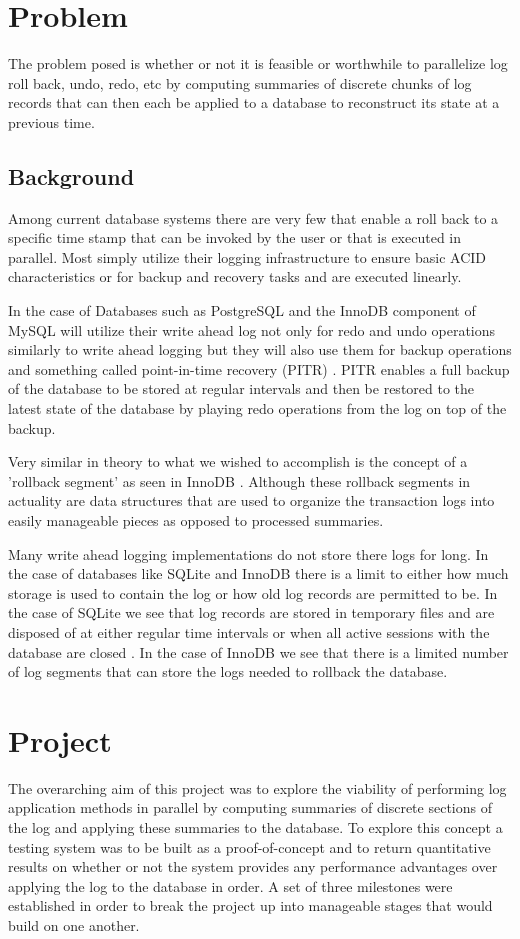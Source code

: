 \documentclass{article}
\begin{document}
\section{Problem}
The problem posed is whether or not it is feasible or worthwhile to parallelize log roll back, undo, redo, etc by computing summaries of discrete chunks of log records that can then each be applied to a database to reconstruct its state at a previous time.

\subsection{Background} 
Among current database systems there are very few that enable a roll back to a specific time stamp that can be invoked by the user or that is executed in parallel. Most simply utilize their logging infrastructure to ensure basic ACID characteristics or for backup and recovery tasks and are executed linearly.

In the case of Databases such as PostgreSQL and the InnoDB component of MySQL will utilize their write ahead log not only for redo and undo operations similarly to write ahead logging but they will also use them for backup operations and something called point-in-time recovery (PITR)\cite{InnoDBpoint} \cite{Postgrespoint}. PITR enables a full backup of the database to be stored at regular intervals and then be restored to the latest state of the database by playing redo operations from the log on top of the backup.

Very similar in theory to what we wished to accomplish is the concept of a 'rollback segment' as seen in InnoDB \cite{InnoDBredo}. Although these rollback segments in actuality are data structures that are used to organize the transaction logs into easily manageable pieces as opposed to processed summaries.

Many write ahead logging implementations do not store there logs for long. In the case of databases like SQLite and InnoDB there is a limit to either how much storage is used to contain the log or how old log records are permitted to be. In the case of SQLite we see that log records are stored in temporary files and are disposed of at either regular time intervals or when all active sessions with the database are closed \cite{SQLiteLog}. In the case of InnoDB we see that there is a limited number of log segments that can store the logs needed to rollback the database\cite{InnoDBUndo}.


\section{Project}
The overarching aim of this project was to explore the viability of performing log application methods in parallel by computing summaries of discrete sections of the log and applying these summaries to the database. To explore this concept a testing system was to be built as a proof-of-concept and to return quantitative results on whether or not the system provides any performance advantages over applying the log to the database in order. A set of three milestones were established in order to break the project up into manageable stages that would build on one another. 
\end{document}
